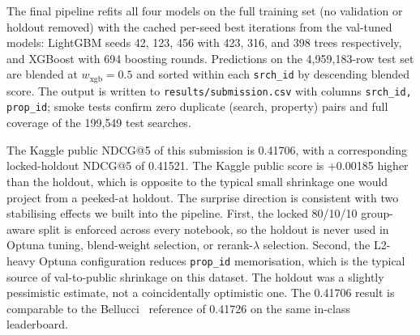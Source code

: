 
The final pipeline refits all four models on the full training set (no validation or holdout removed) with the cached per-seed best iterations from the val-tuned models: LightGBM seeds 42, 123, 456 with 423, 316, and 398 trees respectively, and XGBoost with 694 boosting rounds. Predictions on the 4{,}959{,}183-row test set are blended at $w_{\text{xgb}} = 0.5$ and sorted within each \texttt{srch\_id} by descending blended score. The output is written to \texttt{results/submission.csv} with columns \texttt{srch\_id, prop\_id}; smoke tests confirm zero duplicate (search, property) pairs and full coverage of the 199{,}549 test searches.

The Kaggle public NDCG@5 of this submission is 0.41706, with a corresponding locked-holdout NDCG@5 of 0.41521. The Kaggle public score is +0.00185 higher than the holdout, which is opposite to the typical small shrinkage one would project from a peeked-at holdout. The surprise direction is consistent with two stabilising effects we built into the pipeline. First, the locked 80/10/10 group-aware split is enforced across every notebook, so the holdout is never used in Optuna tuning, blend-weight selection, or rerank-$\lambda$ selection. Second, the L2-heavy Optuna configuration reduces \texttt{prop\_id} memorisation, which is the typical source of val-to-public shrinkage on this dataset. The holdout was a slightly pessimistic estimate, not a coincidentally optimistic one. The 0.41706 result is comparable to the Bellucci~\cite{bellucci2021dmt} reference of 0.41726 on the same in-class leaderboard.
